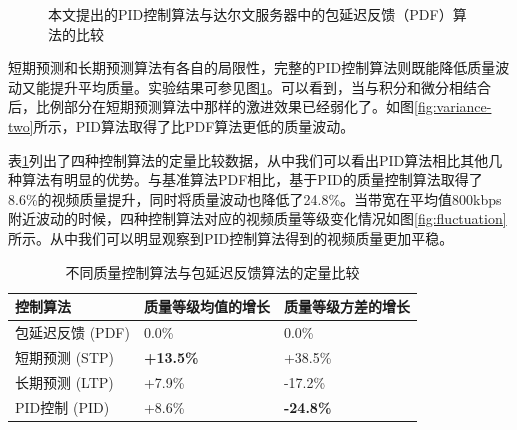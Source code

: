 \begin{figure}[t]
\centering
{}
\caption{本文提出的PID控制算法与达尔文服务器中的包延迟反馈（PDF）算法的比较}
\label{fig:performance-two}
\end{figure}

短期预测和长期预测算法有各自的局限性，完整的PID控制算法则既能降低质量波动又能提升平均质量。实验结果可参见图\ref{fig:performance-two}。可以看到，当与积分和微分相结合后，比例部分在短期预测算法中那样的激进效果已经弱化了。如图\ref{fig:variance-two}所示，PID算法取得了比PDF算法更低的质量波动。

表\ref{tab:improvement}列出了四种控制算法的定量比较数据，从中我们可以看出PID算法相比其他几种算法有明显的优势。与基准算法PDF相比，基于PID的质量控制算法取得了8.6\%的视频质量提升，同时将质量波动也降低了24.8\%。当带宽在平均值800kbps附近波动的时候，四种控制算法对应的视频质量等级变化情况如图\ref{fig:fluctuation}所示。从中我们可以明显观察到PID控制算法得到的视频质量更加平稳。

\begin{table}[h]
\centering
\caption{不同质量控制算法与包延迟反馈算法的定量比较}
\label{tab:improvement}
\begin{tabular}[b]{p{4.2cm}<{\centering}|p{4.2cm}<{\centering}|p{4.2cm}<{\centering}}
\hline \hline
控制算法 & 质量等级均值的增长 & 质量等级方差的增长 \\ \hline
包延迟反馈 (PDF) & 0.0\% & 0.0\% \\ \hline
短期预测 (STP) & \textbf{+13.5\%} & +38.5\% \\ \hline
长期预测 (LTP) & +7.9\% & -17.2\% \\ \hline
PID控制 (PID) & +8.6\% & \textbf{-24.8\%} \\ \hline
\end{tabular}
\end{table}

